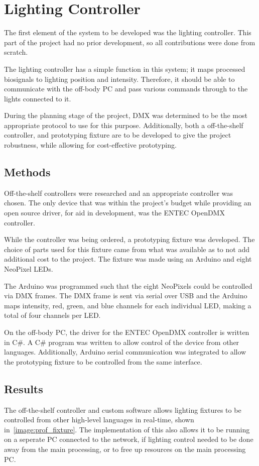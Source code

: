 \chapter{Lighting Controller}
The first element of the system to be developed was the lighting controller.
This part of the project had no prior development, so all contributions were done from scratch.

The lighting controller has a simple function in this system; it maps processed biosignals to lighting position and intensity.
Therefore, it should be able to communicate with the off-body PC and pass various commands through to the lights connected to it.

During the planning stage of the project, DMX was determined to be the most appropriate protocol to use for this purpose.
Additionally, both a off-the-shelf controller, and prototyping fixture are to be developed to give the project robustness,
while allowing for cost-effective prototyping.


\section{Methods}
Off-the-shelf controllers were researched and an appropriate controller was chosen.
The only device that was within the project's budget while providing an open source driver, for aid in development,
was the ENTEC OpenDMX controller.

While the controller was being ordered, a prototyping fixture was developed.
The choice of parts used for this fixture came from what was available as to not add additional cost to the project.
The fixture was made using an Arduino and eight NeoPixel LEDs.

The Arduino was programmed such that the eight NeoPixels could be controlled via DMX frames.
The DMX frame is sent via serial over USB
and the Arduino maps intensity, red, green, and blue channels for each individual LED, making a total of four channels per LED.

On the off-body PC, the driver for the ENTEC OpenDMX controller is written in C\#.
A C\# program was written to allow control of the device from other languages.
Additionally, Arduino serial communication was integrated to allow the prototyping fixture to be controlled from the same interface.


\section{Results}
The off-the-shelf controller and custom software allows lighting fixtures to be controlled from other high-level languages in real-time,
shown in~\autoref{image:prof_fixture}.
The implementation of this also allows it to be running on a seperate PC connected to the network,
if lighting control needed to be done away from the main processing, or to free up resources on the main processing PC.

